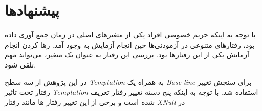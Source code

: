 \section{پیشنهادها}
با  توجه به اینکه  حریم خصوصی افراد یکی از متغیر‌های اصلی در زمان جمع آوری
داده بود، رفتار‌های متنوعی در آزمودنی‌ها حین انجام آزمایش به وجود
آمد. رها کردن انجام آزمایش یکی از این رفتار‌ها
بود. بررسی این رفتار به عنوان یک متغیر، می‌تواند مهم تلقی شود.

در این پژوهش از سه سطح 
\textit{
    \gls{Temptation}
}
به همراه یک 
\textit{
    \gls{Base line}
}
برای سنجش تغییر رفتار تحت تاثیر 
\textit{
    \gls{Temptation}
} 
استفاده شد. با توجه به اینکه پنج دسته تغییر رفتار تعریف شده است و برخی از این تغییر رفتار ها مانند رفتار
\textit{
    \gls{XNull}
}
در
